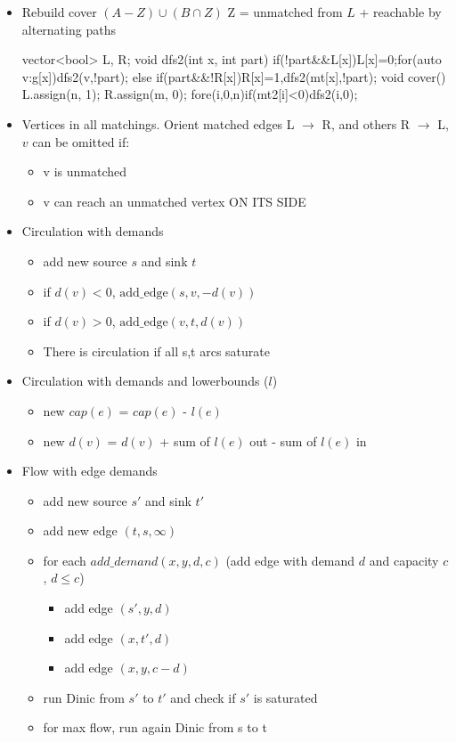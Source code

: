 \begin{itemize}
  \item Rebuild cover $(A-Z)\cup(B\cap Z)$ Z = unmatched from $L$ + reachable by alternating paths
  \begin{code}
  vector<bool> L, R;
  void dfs2(int x, int part) {
    if(!part&&L[x]){L[x]=0;for(auto v:g[x])dfs2(v,!part);}
    else if(part&&!R[x])R[x]=1,dfs2(mt[x],!part);
  }
  void cover() {L.assign(n, 1); R.assign(m, 0);
    fore(i,0,n)if(mt2[i]<0)dfs2(i,0);
  }\end{code}
  \item Vertices in all matchings. Orient matched edges L $\to$ R, and others R $\to$ L, $v$ can be omitted if:
    \begin{itemize}
      \item v is unmatched
      \item v can reach an unmatched vertex ON ITS SIDE
    \end{itemize}
  \item Circulation with demands
  \begin{itemize}
    \item add new source $s$ and sink $t$
    \item if $d(v) < 0$, $\text{add\_edge}(s, v, -d(v))$
    \item if $d(v) > 0$, $\text{add\_edge}(v, t, d(v))$
    \item There is circulation if all s,t arcs saturate
  \end{itemize}
  \item Circulation with demands and lowerbounds ($l$)
  \begin{itemize}
    \item new $cap(e)$ = $cap(e)$ - $l(e)$
    \item new $d(v)$ = $d(v)$ + sum of $l(e)$ out - sum of $l(e)$ in
  \end{itemize}
  \item  Flow with edge demands
  \begin{itemize}
    \item add new source $s'$ and sink $t'$
	\item add new edge $(t,s,\infty)$
	\item for each $add\_demand(x,y,d,c)$ (add edge with demand $d$ and capacity $c$, $d\leq c$)
 	\begin{itemize}
		\item add edge $(s',y,d)$
		\item add edge $(x,t',d)$
		\item add edge $(x,y,c-d)$
	\end{itemize}
	\item run Dinic from $s'$ to $t'$ and check if $s'$ is saturated
	\item for max flow, run again Dinic from s to t
  \end{itemize}

\end{itemize}